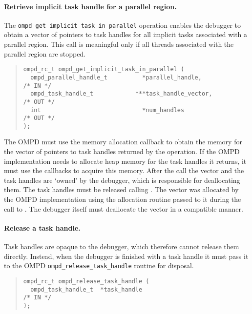 \paragraph{Retrieve implicit task handle for a parallel region.}
The   \verb|ompd_get_implicit_task_in_parallel|  operation enables
the debugger to obtain a vector of pointers to task handles for all
implicit tasks associated with a parallel region.
This call is meaningful only if all threads associated
with the parallel region are stopped.

\begin{quote}
\begin{lstlisting}
ompd_rc_t ompd_get_implicit_task_in_parallel (
  ompd_parallel_handle_t          *parallel_handle,                 /* IN */
  ompd_task_handle_t            ***task_handle_vector,             /* OUT */
  int                             *num_handles                     /* OUT */
);
\end{lstlisting}
\end{quote}
The OMPD must use the memory allocation callback to obtain the
memory for the vector of pointers to task handles returned by the operation.
If the OMPD implementation needs to allocate heap memory for the
task handles it returns, it must use the callbacks to acquire this memory.
After the call the vector and the task handles are `owned' by the debugger,
which is responsible for deallocating them.
The task handles must be released calling
.
The vector was allocated by the OMPD implementation using the
allocation routine passed to it during the call to
.
The debugger itself must deallocate the vector in a compatible manner.

\paragraph{Release a task handle.}
Task handles are opaque to the debugger, which therefore cannot release
them directly.
Instead, when the debugger is finished with a task handle it must
pass it to the OMPD \texttt{ompd\_release\_task\_handle} routine
for disposal.
\begin{quote}
\begin{lstlisting}
ompd_rc_t ompd_release_task_handle (
  ompd_task_handle_t  *task_handle                                  /* IN */
);
\end{lstlisting}
\end{quote}

